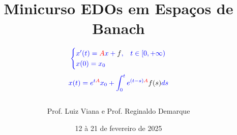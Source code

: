 \documentclass[envcountsect,aspectratio=169]{beamer}
\theoremstyle{definition}
\theoremstyle{exercicio}
\theoremstyle{something}
\theoremstyle{resp}
\theoremstyle{desafio}
\begin{document}
\title[Minicurso sobre EDOs em Espaços de Banach]{Minicurso EDOs em Espaços de Banach}
\author[Luiz Viana/Reginaldo Demarque]{
\vspace{-.5cm}
\begin{equation*}
{\normalsize {\color{blue} 
\begin{cases}
x'(t)={\color{red}A}x+{\color{black}f},& t\in [0,+\infty)\\
x(0)=x_0
\end{cases}}
}
\end{equation*}
\begin{equation*}
{\footnotesize {\color{blue} 
x(t)=e^{t\color{red}A}x_0+\int_0^t e^{(t-s)\color{red}A}{\color{black}f(s)}ds}
}
\end{equation*}\\
Prof. Luiz Viana e Prof. Reginaldo Demarque}



\date{{\color{orange} 12 à 21 de fevereiro de 2025}}
\end{document}
